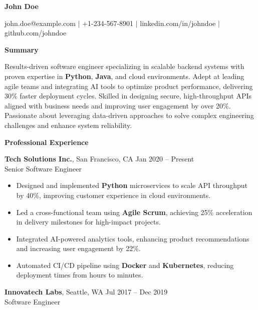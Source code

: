 \documentclass[a4paper,10pt]{article}
\begin{document}

\centerline{\huge \bf John Doe}
\centerline{john.doe@example.com $|$ +1-234-567-8901 $|$ linkedin.com/in/johndoe $|$ github.com/johndoe}

\vspace{12pt}

\noindent
\textbf{Summary}
\vspace{6pt}

\noindent
Results-driven software engineer specializing in scalable backend systems with proven expertise in \textbf{Python}, \textbf{Java}, and cloud environments. Adept at leading agile teams and integrating AI tools to optimize product performance, delivering 30\% faster deployment cycles. Skilled in designing secure, high-throughput APIs aligned with business needs and improving user engagement by over 20\%. Passionate about leveraging data-driven approaches to solve complex engineering challenges and enhance system reliability.

\vspace{12pt}

\noindent
\textbf{Professional Experience}
\vspace{6pt}

\noindent
\textbf{Tech Solutions Inc.}, San Francisco, CA \hfill Jan 2020 -- Present \\
Senior Software Engineer

\begin{itemize}[leftmargin=*]
    \item Designed and implemented \textbf{Python} microservices to scale API throughput by 40\%, improving customer experience in cloud environments.
    \item Led a cross-functional team using \textbf{Agile Scrum}, achieving 25\% acceleration in delivery milestones for high-impact projects.
    \item Integrated AI-powered analytics tools, enhancing product recommendations and increasing user engagement by 22\%.
    \item Automated CI/CD pipeline using \textbf{Docker} and \textbf{Kubernetes}, reducing deployment times from hours to minutes.
\end{itemize}

\vspace{6pt}

\noindent
\textbf{Innovatech Labs}, Seattle, WA \hfill Jul 2017 -- Dec 2019 \\
Software Engineer
\end{document}

